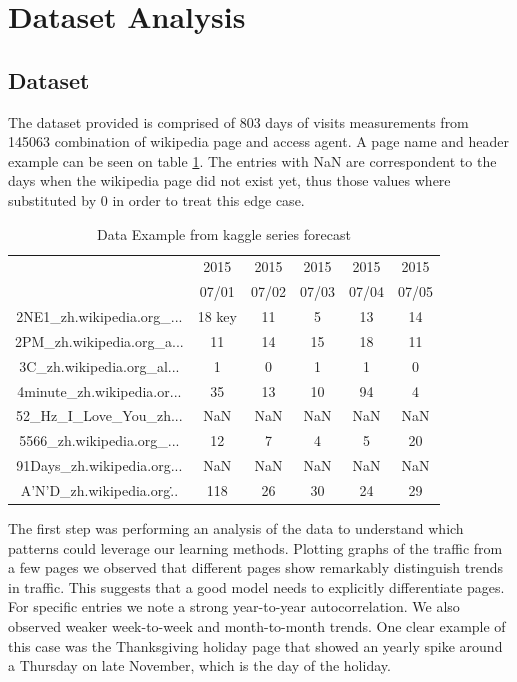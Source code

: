 \section{Dataset Analysis}

\subsection{Dataset}
The dataset provided is comprised of 803 days of visits measurements from 145063 combination of wikipedia page and access agent. A page name and header example can be seen on table \ref{tab:wiki_data}. The entries with NaN are correspondent to the days when the wikipedia page did not exist yet, thus those values where substituted by 0 in order to treat this edge case.

\begin{table}[htbp]
\centering
	\begin{tabular}{|c|c|c|c|c|c|}\hline
		&2015&2015&2015&2015&2015\\
		&07/01&07/02&07/03&07/04&07/05\\\hline
		2NE1\_zh.wikipedia.org\_...& 18  key& 11  & 5   & 13  & 14 \\\hline
		2PM\_zh.wikipedia.org\_a...& 11  & 14  & 15  & 18  & 11 \\\hline
		3C\_zh.wikipedia.org\_al...& 1   & 0   & 1   & 1   & 0 \\ \hline
		4minute\_zh.wikipedia.or...& 35  & 13  & 10  & 94  & 4 \\\hline
		52\_Hz\_I\_Love\_You\_zh...& NaN & NaN & NaN & NaN & NaN \\\hline
		5566\_zh.wikipedia.org\_...& 12 & 7 & 4 & 5 & 20 \\\hline
		91Days\_zh.wikipedia.org...&NaN&NaN&NaN&NaN&NaN \\\hline
		A'N'D\_zh.wikipedia.org\...& 118 & 26 & 30 & 24 & 29\\\hline
	\end{tabular}
	\vspace{1mm}
		\caption{Data Example from kaggle series forecast\label{tab:wiki_data}}
\end{table}

The first step was performing an analysis of the data to understand which patterns could leverage our learning methods. Plotting graphs of the traffic from a few pages we observed that different pages show remarkably distinguish trends in traffic. This suggests that a good model needs to explicitly differentiate pages.
For specific entries we note a strong year-to-year autocorrelation. We also observed weaker week-to-week and month-to-month trends. One clear example of this case was the Thanksgiving holiday page that showed an yearly spike around a Thursday on late November, which is the day of the holiday.

